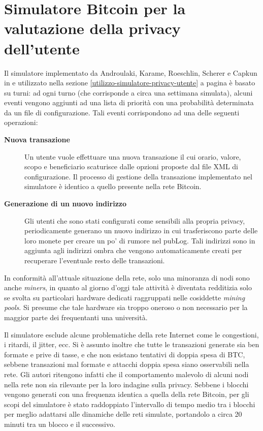 \chapter{Simulatore Bitcoin per la valutazione della privacy dell'utente}

Il simulatore implementato da Androulaki, Karame, Roeschlin, Scherer e Capkun in \cite{user-privacy} e utilizzato nella sezione \ref{utilizzo-simulatore-privacy-utente} a pagina \pageref{utilizzo-simulatore-privacy-utente} è basato su turni: ad ogni turno (che corrisponde a circa una settimana simulata), alcuni eventi vengono aggiunti ad una lista di priorità con una probabilità determinata da un file di configurazione.
Tali eventi corrispondono ad una delle seguenti operazioni:

\begin{description}
    \item[\textbf{Nuova transazione}]
      Un utente vuole effettuare una nuova transazione il cui orario, valore, scopo e beneficiario scaturisce dalle opzioni proposte dal file XML di configurazione. Il processo di gestione della transazione implementato nel simulatore è identico a quello presente nella rete Bitcoin.
    \item[\textbf{Generazione di un nuovo indirizzo}]
      Gli utenti che sono stati configurati come sensibili alla propria privacy, periodicamente generano un nuovo indirizzo in cui trasferiscono parte delle loro monete per creare un po' di rumore nel pubLog. Tali indirizzi sono in aggiunta agli indirizzi ombra che vengono automaticamente creati per recuperare l'eventuale resto delle transazioni.
\end{description}

In conformità all'attuale situazione della rete, solo una minoranza di nodi sono anche \emph{miners}, in quanto al giorno d'oggi tale attività è diventata redditizia solo se svolta su particolari hardware dedicati raggruppati nelle cosiddette \emph{mining pools}. Si presume che tale hardware sia troppo oneroso o non necessario per la maggior parte dei frequentanti una università.

Il simulatore esclude alcune problematiche della rete Internet come le congestioni, i ritardi, il jitter, ecc.
Si è assunto inoltre che tutte le transazioni generate sia ben formate e prive di tasse, e che non esistano tentativi di doppia spesa di BTC, sebbene transazioni mal formate e attacchi doppia spesa siano osservabili nella rete.
Gli autori ritengono infatti che il comportamento malevolo di alcuni nodi nella rete non sia rilevante per la loro indagine sulla privacy.
Sebbene i blocchi vengono generati con una frequenza identica a quella della rete Bitcoin, per gli scopi del simulatore è stato raddoppiato l'intervallo di tempo medio tra i blocchi per meglio adattarsi alle dinamiche delle reti simulate, portandolo a circa 20 minuti tra un blocco e il successivo.

